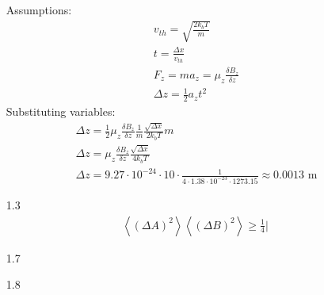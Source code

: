 \documentclass[12pt]{article}
\begin{document}
\begin{enumerate}
        Assumptions:
        \begin{gather*}
            v_{th}=\sqrt{\frac{2k_b T}{m}}\\
            t=\frac{\Delta x}{v_{th}}\\
            F_z=ma_z=\mu_z\frac{\delta B_z}{\delta z}\\
            \Delta z=\frac{1}{2}a_z t^2
        \end{gather*}
        Substituting variables:
        \begin{gather*}
            \Delta z=\frac{1}{2}\mu_z\frac{\delta B_z}{\delta z}\frac{1}{m}\frac{\sqrt{\Delta x}}{2k_b T}m\\
            \Delta z=\mu_z\frac{\delta B_z}{\delta z}\frac{\sqrt{\Delta x}}{4k_b T}\\
            \Delta z=9.27\cdot10^{-24}\cdot10\cdot\frac{1}{4\cdot1.38\cdot10^{-23}\cdot1273.15}\approx0.0013\text{ m}
        \end{gather*}
        \item[1.3]
        \begin{gather*}
            \left<(\Delta A)^2\right>\left<(\Delta B)^2\right>\geq\frac{1}{4}|\
        \end{gather*}
        \item[1.7]
        \item[1.8]
    \end{enumerate}
\end{document}
